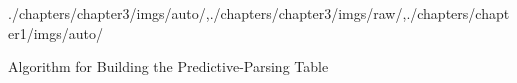 \begin{graphicspathcontext}{{./chapters/chapter3/imgs/auto/},{./chapters/chapter3/imgs/raw/},{./chapters/chapter1/imgs/auto/}}
\begin{bibunit}[apalike]
\begin{frame}[t]{{Algorithm} for Building the Predictive-Parsing Table}
	\vspace{-.25cm}
	\begin{myalgorithm}\smaller
		\BlankLine
	\end{myalgorithm}
\end{frame}


\end{bibunit}
\end{graphicspathcontext}
